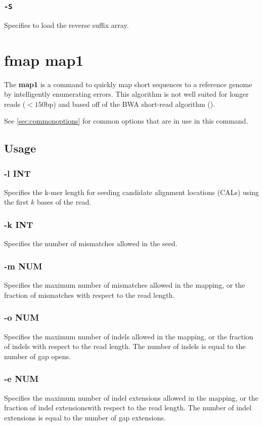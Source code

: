 \documentclass[a4paper,12pt]{book}
\newcommand{\TT}[1]{{\tt #1}} %
\newcommand{\BF}[1]{{\bf #1}} %
\begin{document}
\subsubsection{\TT{-S}}
Specifies to load the reverse suffix array.

\section{fmap map1}
\label{sec:map1}
The \BF{map1} is a command to quickly map short sequences to a reference genome by intelligently enumerating errors.
This algorithm is not well suited for longer reads ($<150$bp) and based off of the BWA short-read algorithm (\cite{BWA-short}).

See \autoref{sec:commonoptions} for common options that are in use in this command.

\subsection{Usage}

\subsubsection{-l INT}
Specifies the k-mer length for seeding candidate alignment locations (CALs) using the first $k$ bases of the read.

\subsubsection{-k INT}
Specifies the number of mismatches allowed in the seed.

\subsubsection{-m NUM}
Specifies the maximum number of mismatches allowed in the mapping, or the fraction of mismatches with respect to the read length.

\subsubsection{-o NUM}
Specifies the maximum number of indels allowed in the mapping, or the fraction of indels with respect to the read length.
The number of indels is equal to the number of gap opens.

\subsubsection{-e NUM}
Specifies the maximum number of indel extensions allowed in the mapping, or the fraction of indel extensionswith respect to the read length.
The number of indel extensions is equal to the number of gap extensions.
\end{document}
